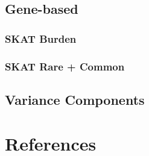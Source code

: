 \documentclass[paper=a4, fontsize=11pt]{scrartcl}	%
\numberwithin{equation}{section}		%
\numberwithin{figure}{section}			%
\numberwithin{table}{section}				%
\begin{document}
	\subsection{Gene-based}
		\subsubsection{SKAT Burden}
		\subsubsection{SKAT Rare + Common}
		\subsection{Variance Components}

\section{References}


\end{document}
